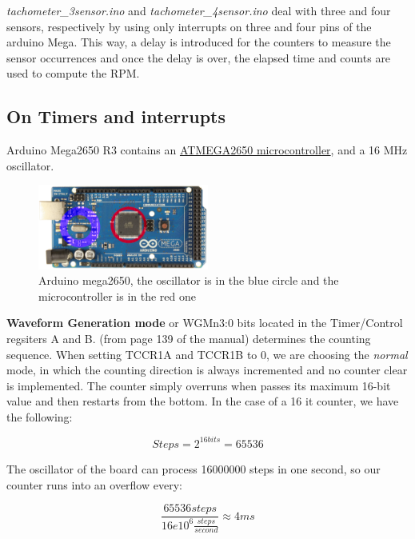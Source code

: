 \documentclass[a4paper]{article}
\begin{document}
\textit{tachometer\_3sensor.ino} and \textit{tachometer\_4sensor.ino} deal with three and four sensors, respectively by using only interrupts on three and four pins of the arduino Mega. This way, a delay is introduced for the counters to measure the sensor occurrences and once the delay is over, the elapsed time and counts are used to compute the RPM.


\subsection{On Timers and interrupts}
\label{sec:ontimersandinterrupts}

Arduino Mega2650 R3 contains an \hyperref{https://ww1.microchip.com/downloads/en/devicedoc/atmel-2549-8-bit-avr-microcontroller-atmega640-1280-1281-2560-2561_datasheet.pdf}{category}{name}{ATMEGA2650 microcontroller}, and a 16 MHz oscillator.

\begin{figure}[h!]
	\centering
	\includegraphics[width=0.5\textwidth]{arduino_mega.png}
	\caption{Arduino mega2650, the oscillator is in the blue circle and the microcontroller is in the red one}
	\label{fig:arduino_mega}
\end{figure}

\textbf{Waveform Generation mode} or WGMn3:0 bits located in the Timer/Control regsiters A and B. (from page 139 of the manual) determines the counting sequence. When setting TCCR1A and TCCR1B to 0, we are choosing the \textit{normal} mode, in which the counting direction is always incremented and no counter clear is implemented.  The counter simply overruns when passes its maximum 16-bit value and then restarts from the bottom. In the case of a 16 it counter, we have the following:

\begin{equation}
	Steps = 2^{16bits} = 65536
\end{equation}

The oscillator of the board can process 16000000 steps in one second, so our counter runs into an overflow every:

\begin{equation}
	\frac{65536 steps}{16e10^{6}\frac{steps}{second}} \approx 4ms
\end{equation}
\end{document}
